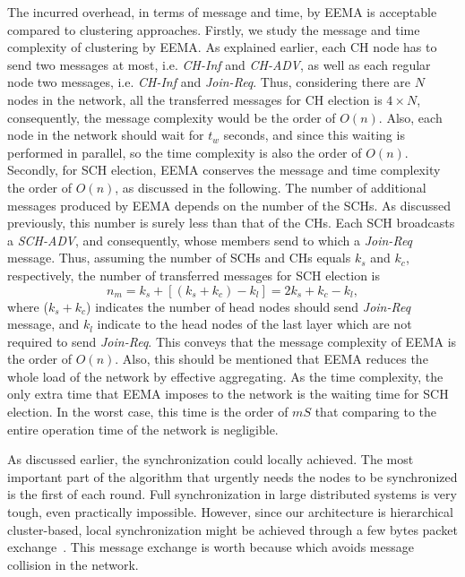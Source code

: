 \documentclass[journal]{IEEEtran}
\begin{document}
The incurred overhead, in terms of message and time, by EEMA is acceptable compared to clustering approaches.  Firstly, we study the message and time complexity of clustering by EEMA.  As explained earlier, each CH node has to send two messages at most, i.e. {\it CH-Inf} and {\it CH-ADV}, as well as each regular node two messages, i.e. {\it CH-Inf} and {\it Join-Req}.  Thus, considering there are $N$ nodes in the network, all the transferred messages for CH election is $4 \times N$, consequently, the message complexity would be the order of $O(n)$.  Also, each node in the network should wait for $t_w$ seconds, and since this waiting is performed in parallel, so the time complexity is also the order of $O(n)$.  Secondly, for SCH election, EEMA conserves the message and time complexity the order of $O(n)$, as discussed in the following.  The number of additional messages produced by EEMA depends on the number of the SCHs.  As discussed previously, this number is surely less than that of the CHs.  Each SCH broadcasts a {\it SCH-ADV}, and consequently, whose members send to which a {\it Join-Req} message.  Thus, assuming the number of SCHs and CHs equals $k_s$ and $k_c$, respectively, the number of transferred messages for SCH election is
 \begin{equation}
\label{eq:mes-comp}
n_m=k_s + [(k_s + k_c) - k_l]= 2k_s + k_c - k_l,
\end{equation}
where ($k_s + k_c$) indicates the number of head nodes should send {\it Join-Req} message, and $k_l$ indicate to the head nodes of the last layer which are not required to send {\it Join-Req}.  This conveys that the message complexity of EEMA is the order of $O(n)$.  Also, this should be mentioned that EEMA reduces the whole load of the network by effective aggregating.  As the time complexity, the only extra time that EEMA imposes to the network is the waiting time for SCH election.  In the worst case, this time is the order of $mS$ that comparing to the entire operation time of the network is negligible.  

As discussed earlier, the synchronization could locally achieved.  The most important part of the algorithm that urgently needs the nodes to be synchronized is the first of each round.  Full synchronization in large distributed systems is very tough, even practically impossible.  However, since our architecture is hierarchical cluster-based, local synchronization might be achieved through a few bytes packet exchange~\cite{zhu}.  This message exchange is worth because which avoids message collision in the network.
\end{document}
